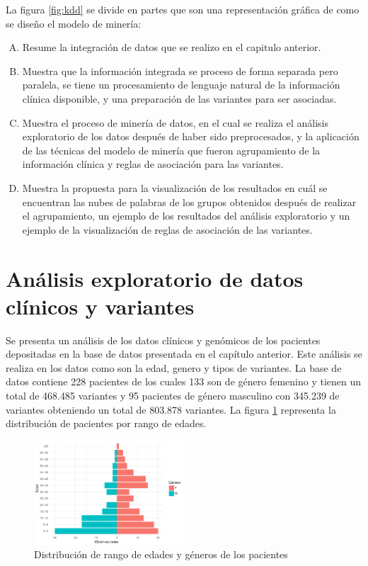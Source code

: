  La figura \ref{fig:kdd} se divide en partes que son una representación gráfica de como se diseño el modelo de minería:
 
 \begin{enumerate}[A)]
 	\item Resume la integración de datos que se realizo en el capitulo anterior.
 	\item Muestra que la información integrada se proceso de forma separada pero paralela, se tiene un procesamiento de lenguaje natural de la información clínica disponible, y una preparación de las variantes para ser asociadas.
 	\item Muestra el proceso de minería de datos, en el cual se realiza el análisis exploratorio de los datos después de haber sido preprocesados, y la aplicación de las técnicas del modelo de minería que fueron agrupamiento de la información clínica y reglas de asociación para las variantes.
 	\item  Muestra la propuesta para la visualización de los resultados en cuál se encuentran las nubes de palabras de los grupos obtenidos después de realizar el agrupamiento, un ejemplo de los resultados del análisis exploratorio y un ejemplo de la visualización de reglas de asociación de las variantes.
 \end{enumerate}
 

\section{Análisis exploratorio de datos clínicos y variantes}

Se presenta un análisis de los datos clínicos  y genómicos de los pacientes depositadas en la base de datos presentada en el capítulo anterior. Este análisis se realiza en los datos como son la edad, genero y tipos de variantes. La base de datos contiene 228 pacientes de los cuales 133 son de género femenino y tienen un total de 468.485 variantes y 95 pacientes de género masculino con 345.239 de variantes obteniendo  un total de 803.878 variantes. La  figura \ref{fig:general} representa la distribución de pacientes por rango de edades.\\

\begin{figure}[h]
	\centering
	\includegraphics[width=0.5\textwidth]{Kap4/general}
	\caption{Distribución de rango de edades y géneros de los pacientes}
	\label{fig:general}
\end{figure}

